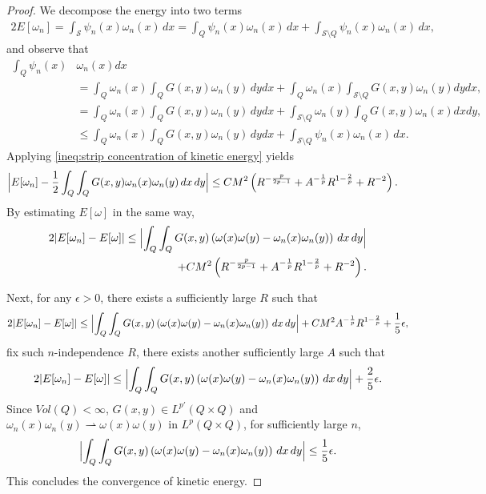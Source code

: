 \documentclass[11pt,letterpaper]{amsart}
\theoremstyle{definition}
\theoremstyle{remark}
\renewcommand{\S}{\mathcal{S}}
\newcommand{\eps}{\epsilon}
\numberwithin{equation}{section}
\begin{document}
\begin{proof}
    We decompose the energy into two terms
    \begin{align*}
        2E[\omega_n] = \int_{\S} \psi_n(x)\omega_n(x)\,dx = \int_{Q} \psi_n(x)\omega_n(x)\,dx + \int_{\S\setminus Q} \psi_n(x)\omega_n(x)\,dx,
    \end{align*}
    and observe that
    \begin{align*}
        \int_{Q} \psi_n(x)&\omega_n(x)dx \\
        &= \int_{Q} \omega_n(x) \int_{Q} G(x,y)\omega_n(y)\,dydx + \int_{Q} \omega_n(x)\int_{\S\setminus Q} G(x,y)\omega_n(y)dydx,\\
        &= \int_{Q} \omega_n(x) \int_{Q} G(x,y)\omega_n(y)\,dydx + \int_{\S\setminus Q} \omega_n(y)\int_{Q} G(x,y)\omega_n(x)dxdy,\\
        &\leq \int_{Q} \omega_n(x) \int_{Q} G(x,y)\omega_n(y)\,dydx + \int_{\S \setminus Q} \psi_n(x)\omega_n(x)\,dx.
    \end{align*}
    Applying \eqref{ineq:strip concentration of kinetic energy} yields
    \begin{align*}
        \Bigl|E[\omega_n] & - \frac{1}{2}\int_{Q}\int_{Q} G(x,y)\omega_n(x)\omega_n(y)\,dx\,dy \Bigr|  \leq CM^2\left(R^{-\frac{p}{2p-1}} + A^{-\frac{1}{p}} R^{1-\frac{2}{p}} + R^{-2} \right).
    \end{align*}
    By estimating $E[\omega]$ in the same way,
    \begin{align*}
        2|E[\omega_n] - E[\omega]| \le \Bigl| \int_{Q}\int_{Q} G(x,y) \left(\omega(x)\omega(y) - \omega_n(x)\omega_n(y) \right) \,dx\,dy \Bigr| \\
        + CM^2\left(R^{-\frac{p}{2p-1}} + A^{-\frac{1}{p}} R^{1-\frac{2}{p}} + R^{-2} \right).
    \end{align*}

    Next, for any $\eps>0$, there exists a sufficiently large $R$ such that 
    \begin{align*}
        2|E[\omega_n] - E[\omega]| \le \Bigl| \int_{Q}\int_{Q} G(x,y) \left(\omega(x)\omega(y) - \omega_n(x)\omega_n(y) \right) \,dx\,dy \Bigr| + CM^2 A^{-\frac{1}{p}} R^{1-\frac{2}{p}} + \frac{1}{5}\eps,
    \end{align*}
    fix such $n$-independence $R$, there exists another sufficiently large $A$ such that 
    \begin{align*}
        2|E[\omega_n] - E[\omega]| \le \Bigl| \int_{Q}\int_{Q} G(x,y) \left(\omega(x)\omega(y) - \omega_n(x)\omega_n(y) \right) \,dx\,dy \Bigr| + \frac{2}{5}\eps.
    \end{align*}
    Since $Vol(Q)<\infty$, $G(x,y) \in L^{p'}(Q \times Q)$ and $\omega_n(x)\omega_n(y) \rightharpoonup \omega(x)\omega(y)$ in $L^p(Q \times Q)$, for sufficiently large $n$,
    \begin{align*}
        \Bigl| \int_{Q}\int_{Q} G(x,y) \left(\omega(x)\omega(y) - \omega_n(x)\omega_n(y) \right) \,dx\,dy \Bigr| \leq  \frac{1}{5}\eps.
    \end{align*}
    This concludes the convergence of kinetic energy.

\end{proof}
\end{document}
